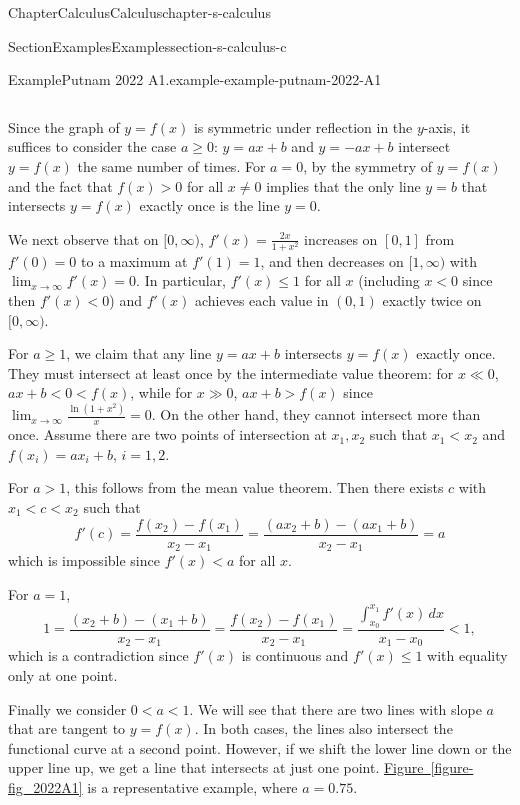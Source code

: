 \documentclass[oneside,10pt,]{book}
\newcommand{\xreffont}{\relax}
\numberwithin{equation}{section}
\newcommand{\lt}{<}
\begin{document}
\begin{chapterptx}{Chapter}{Calculus}{}{Calculus}{}{}{chapter-s-calculus}
\begin{sectionptx}{Section}{Examples}{}{Examples}{}{}{section-s-calculus-c}
\begin{example}{Example}{Putnam 2022 A1.}{example-example-putnam-2022-A1}
\begin{itemize}[label=\textbullet]
\begin{equation*}
\end{equation*}
%
\end{itemize}
%
\par
Since the graph of \(y=f(x)\) is symmetric under reflection in the \(y\)-axis, it suffices to consider the case \(a \geq 0\): \(y=ax+b\) and \(y=-ax+b\) intersect \(y=f(x)\) the same number of times. For \(a=0\), by the symmetry of \(y=f(x)\) and the fact that \(f(x)> 0\) for all \(x\neq 0\) implies that the only line \(y=b\) that intersects \(y=f(x)\) exactly once is the line \(y=0\).%
\par
We next observe that on \([0,\infty)\), \(f'(x) = \frac{2x}{1+x^2}\) increases on \([0,1]\) from \(f'(0)=0\) to a maximum at \(f'(1)=1\), and then decreases on \([1,\infty)\) with \(\lim_{x\to\infty} f'(x)=0\). In particular, \(f'(x) \leq 1\) for all \(x\) (including \(x \lt 0\) since then \(f'(x) \lt 0\)) and \(f'(x)\) achieves each value in \((0,1)\) exactly twice on \([0,\infty)\).%
\par
For \(a \geq 1\), we claim that any line \(y=ax+b\) intersects \(y=f(x)\) exactly once. They must intersect at least once by the intermediate value theorem: for \(x \ll 0\), \(ax+b \lt 0 \lt f(x)\), while for \(x \gg 0\), \(ax+b>f(x)\) since \(\lim_{x\to\infty} \frac{\ln(1+x^2)}{x} = 0\). On the other hand, they cannot intersect more than once. Assume there are two points of intersection at \(x_1, x_2\) such that \(x_1 \lt x_2\) and  \(f(x_i)=a x_i + b\), \(i=1,2\).%
\par
For \(a>1\), this follows from the mean value theorem.    Then there exists \(c\) with \(x_1 \lt c \lt x_2\) such that%
\begin{equation*}
f'(c) = \frac{f(x_2)-f(x_1)}{x_2-x_1} = \frac{(a x_2 + b)-(a x_1+b)}{x_2-x_1} = a
\end{equation*}
which is impossible since \(f'(x) \lt a\) for all \(x\).%
\par
For \(a=1\),%
\begin{equation*}
1 = \frac{(x_2+b)-(x_1+b)}{x_2-x_1} =\frac{f(x_2)-f(x_1)}{x_2-x_1}=\frac{\int_{x_0}^{x_1} f'(x)\,dx}{x_1-x_0} \lt 1,
\end{equation*}
which is a contradiction since \(f'(x)\) is continuous and \(f'(x) \leq 1\) with equality only at one point.%
\par
Finally we consider \(0 \lt a \lt 1\). We will see that there are two lines with slope \(a\) that are tangent to \(y=f(x)\).  In both cases, the lines also intersect the functional curve at a second point.  However, if we shift the lower line down or the upper line up, we get a line that intersects at just one point. \hyperref[figure-fig_2022A1]{Figure~{\xreffont\ref{figure-fig_2022A1}}} is a representative example, where \(a=0.75\).%

\end{example}
\end{sectionptx}
\end{chapterptx}
\end{document}
